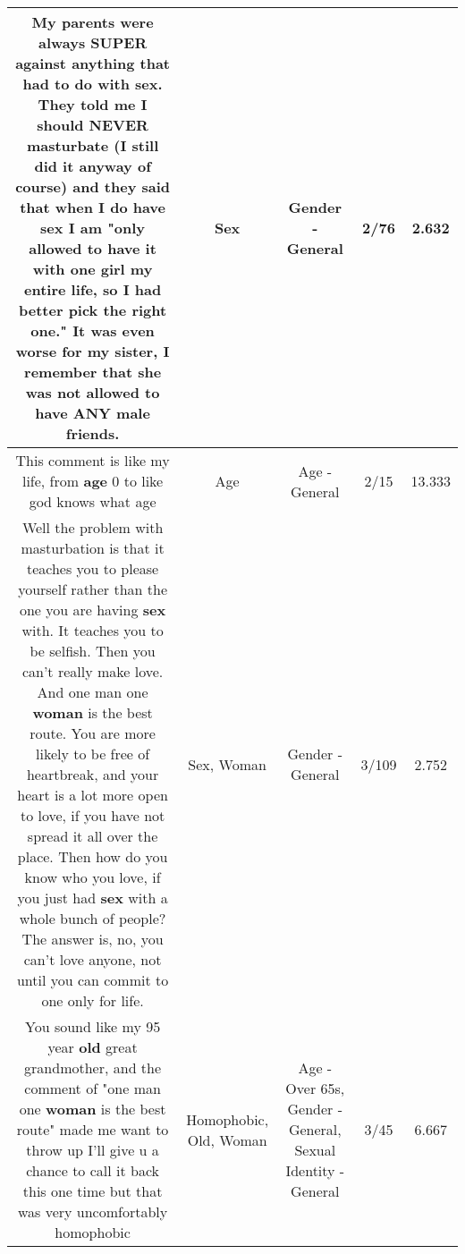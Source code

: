 \documentclass[11pt]{article}
\newlength\mylength
\begin{document}
\begin{center}
\begin{longtable}{|C{.65\mylength}|C{.30\mylength}|C{.12\mylength}|C{.12\mylength}|C{.12\mylength}|}
  \small My parents were always SUPER against anything that had to do with \textbf{sex}. They told me I should NEVER masturbate (I still did it anyway of course) and they said that when I do have \textbf{sex} I am "only allowed to have it with one girl my entire life, so I had better pick the right one." It was even worse for my sister, I remember that she was not allowed to have ANY male friends.\normalsize   & Sex & Gender - General & 2/76 & 2.632 \\  \hline
  \small This comment is like my life, from \textbf{age} 0 to like god knows what age\normalsize   & Age & Age - General & 2/15 & 13.333 \\  \hline
  \small Well the problem with masturbation is that it teaches you to please yourself rather than the one you are having \textbf{sex} with. It teaches you to be selfish. Then you can't really make love. And one man one \textbf{woman} is the best route. You are more likely to be free of heartbreak, and your heart is a lot more open to love, if you have not spread it all over the place. Then how do you know who you love, if you just had \textbf{sex} with a whole bunch of people? The answer is, no, you can't love anyone, not until you can commit to one only for life.\normalsize   & Sex, Woman & Gender - General & 3/109 & 2.752 \\  \hline
  \small You sound like my 95 year \textbf{old} great grandmother, and the comment of "one man one \textbf{woman} is the best route" made me want to throw up I'll give u a chance to call it back this one time but that was very uncomfortably homophobic\normalsize   & Homophobic, Old, Woman & Age - Over 65s, Gender - General, Sexual Identity - General & 3/45 & 6.667 \\  \hline

\end{longtable}
\end{center}
\end{document}
